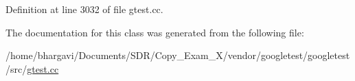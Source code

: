 Definition at line 3032 of file gtest.\+cc.



The documentation for this class was generated from the following file\+:\begin{DoxyCompactItemize}
\item 
/home/bhargavi/\+Documents/\+S\+D\+R/\+Copy\+\_\+\+Exam\+\_\+X/vendor/googletest/googletest/src/\hyperlink{gtest_8cc}{gtest.\+cc}\end{DoxyCompactItemize}
